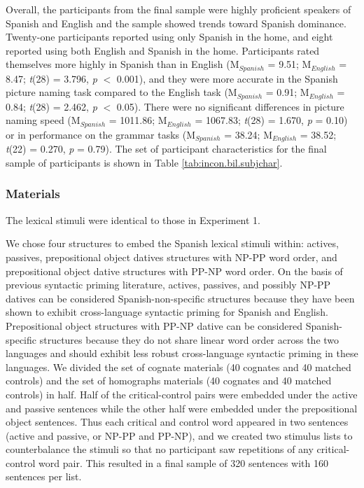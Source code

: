 Overall, the participants from the final sample were highly proficient speakers of Spanish and English and the sample showed trends toward Spanish dominance. Twenty-one participants reported using only Spanish in the home, and eight reported using both English and Spanish in the home. Participants rated themselves more highly in Spanish than in English (M$_{Spanish}$ = 9.51; M$_{English}$ = 8.47; \emph{t}(28) = 3.796, \emph{p} $<$ 0.001), and they were more accurate in the Spanish picture naming task compared to the English task (M$_{Spanish}$ = 0.91; M$_{English}$ = 0.84; \emph{t}(28) = 2.462, \emph{p} $<$ 0.05). There were no significant differences in picture naming speed (M$_{Spanish}$ = 1011.86; M$_{English}$ = 1067.83; \emph{t}(28) = 1.670, \emph{p} = 0.10) or in performance on the grammar tasks (M$_{Spanish}$ = 38.24; M$_{English}$ = 38.52; \emph{t}(22) = 0.270, \emph{p} = 0.79). The set of participant characteristics for the final sample of participants is shown in Table \ref{tab:incon.bil.subjchar}.

\subsubsection{Materials}
\label{materials}

The lexical stimuli were identical to those in Experiment 1.

We chose four structures to embed the Spanish lexical stimuli within: actives, passives, prepositional object datives structures with NP-PP word order, and prepositional object dative structures with PP-NP word order. On the basis of previous syntactic priming literature, actives, passives, and possibly NP-PP datives can be considered Spanish-non-specific structures because they have been shown to exhibit cross-language syntactic priming for Spanish and English. Prepositional object structures with PP-NP dative can be considered Spanish-specific structures because they do not share linear word order across the two languages and should exhibit less robust cross-language syntactic priming in these languages. We divided the set of cognate materials (40 cognates and 40 matched controls) and the set of homographs materials (40 cognates and 40 matched controls) in half. Half of the critical-control pairs were embedded under the active and passive sentences while the other half were embedded under the prepositional object sentences. Thus each critical and control word appeared in two sentences (active and passive, or NP-PP and PP-NP), and we created two stimulus lists to counterbalance the stimuli so that no participant saw repetitions of any critical-control word pair. This resulted in a final sample of 320 sentences with 160 sentences per list.


